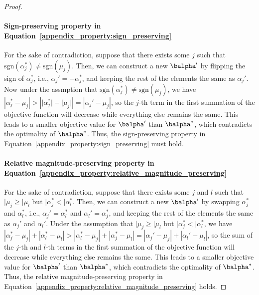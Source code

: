 \begin{proof}
\paragraph{Sign-preserving property in Equation~\eqref{appendix_property:sign_preserving}} 
For the sake of contradiction, suppose that there exists some $j$ such that $\text{sgn}(\alpha_j^*) \neq \text{sgn}(\mu_j)$.
Then, we can construct a new $\balpha'$ by flipping the sign of $\alpha_j^*$, i.e., $\alpha_j' = -\alpha_j^*$, and keeping the rest of the elements the same as $\alpha_j'$.
Now under the assmption that $\text{sgn}(\alpha_j^*) \neq \text{sgn}(\mu_j)$, we have $\left\lvert{\alpha_j^* - \mu_j}\right\rvert > \left\lvert{\lvert{\alpha_j^*}\rvert - \lvert{\mu_j}\rvert}\right\rvert = \left\lvert{\alpha_j' - \mu_j}\right\rvert$, so the $j$-th term in the first summation of the objective function will decrease while everything else remains the same.
This leads to a smaller objective value for $\balpha'$ than $\balpha^*$, which contradicts the optimality of $\balpha^*$.
Thus, the sign-preserving property in Equation~\eqref{appendix_property:sign_preserving} must hold.

\paragraph{Relative magnitude-preserving property in Equation~\eqref{appendix_property:relative_magnitude_preserving}} 
For the sake of contradiction, suppose that there exists some $j$ and $l$ such that $\vert{\mu_j} \geq \vert{\mu_l}$ but $\vert{\alpha_j^*} < \vert{\alpha_l^*}$.
Then, we can construct a new $\balpha'$ by swapping $\alpha_j^*$ and $\alpha_l^*$, i.e., $\alpha_j' = \alpha_l^*$ and $\alpha_l' = \alpha_j^*$, and keeping the rest of the elements the same as $\alpha_j'$ and $\alpha_l'$.
Under the assumption that $\vert{\mu_j} \geq \vert{\mu_l}$ but $\vert{\alpha_j^*} < \vert{\alpha_l^*}$, we have $\left\lvert{\alpha_j^* - \mu_j}\right\rvert + \left\lvert{\alpha_l^* - \mu_l}\right\rvert > \left\lvert{\alpha_l^* - \mu_j}\right\rvert + \left\lvert{\alpha_j^* - \mu_l}\right\rvert =
\left\lvert{\alpha_j' - \mu_j}\right\rvert + \left\lvert{\alpha_l' - \mu_l}\right\rvert$, so the sum of the $j$-th and $l$-th terms in the first summation of the objective function will decrease while everything else remains the same.
This leads to a smaller objective value for $\balpha'$ than $\balpha^*$, which contradicts the optimality of $\balpha^*$.
Thus, the relative magnitude-preserving property in Equation~\eqref{appendix_property:relative_magnitude_preserving} holds.


\end{proof}
